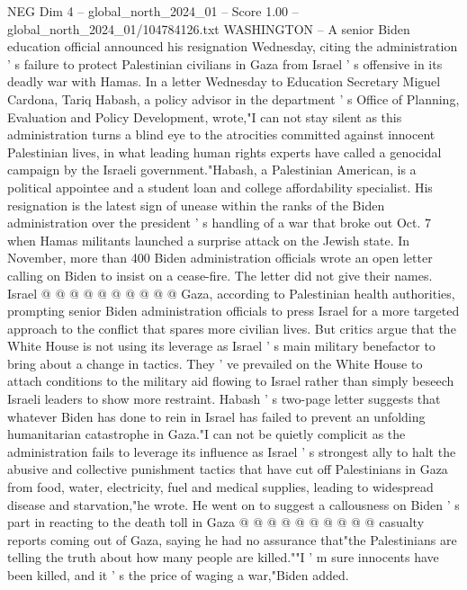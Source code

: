 \begin{textsample}{NEG Dim 4 – global\_north\_2024\_01 – Score 1.00 – global\_north\_2024\_01/104784126.txt}  \label{ex:f4_neg_127}
WASHINGTON -- A senior Biden education official announced his resignation Wednesday, citing the administration ' s failure to protect Palestinian civilians in Gaza from Israel ' s offensive in its deadly war with Hamas.
In a letter Wednesday to Education Secretary Miguel Cardona, Tariq Habash, a policy advisor in the department ' s Office of Planning, Evaluation and Policy Development, wrote,"I can not stay silent as this administration turns a blind eye to the atrocities committed against innocent Palestinian lives, in what leading human rights experts have called a genocidal campaign by the Israeli government."Habash, a Palestinian American, is a political appointee and a student loan and college affordability specialist.
His resignation is the latest sign of unease within the ranks of the Biden administration over the president ' s handling of a war that broke out Oct. 7 when Hamas militants launched a surprise attack on the Jewish state.
In November, more than 400 Biden administration officials wrote an open letter calling on Biden to insist on a cease-fire.
The letter did not give their names.
Israel @ @ @ @ @ @ @ @ @ @ Gaza, according to Palestinian health authorities, prompting senior Biden administration officials to press Israel for a more targeted approach to the conflict that spares more civilian lives.
But critics argue that the White House is not using its leverage as Israel ' s main military benefactor to bring about a change in tactics.
They ' ve prevailed on the White House to attach conditions to the military aid flowing to Israel rather than simply beseech Israeli leaders to show more restraint.
Habash ' s two-page letter suggests that whatever Biden has done to rein in Israel has failed to prevent an unfolding humanitarian catastrophe in Gaza."I can not be quietly complicit as the administration fails to leverage its influence as Israel ' s strongest ally to halt the abusive and collective punishment tactics that have cut off Palestinians in Gaza from food, water, electricity, fuel and medical supplies, leading to widespread disease and starvation,"he wrote.
He went on to suggest a callousness on Biden ' s part in reacting to the death toll in Gaza @ @ @ @ @ @ @ @ @ @ casualty reports coming out of Gaza, saying he had no assurance that"the Palestinians are telling the truth about how many people are killed.""I ' m sure innocents have been killed, and it ' s the price of waging a war,"Biden added.

\end{textsample}
